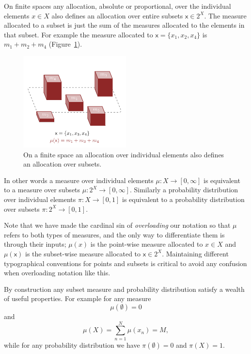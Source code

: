 \documentclass[
  letterpaper,
  DIV=11,
  numbers=noendperiod]{scrartcl}
\begin{document}
On finite spaces any allocation, absolute or proportional, over the
individual elements \(x \in X\) also defines an allocation over entire
subsets \(\mathsf{x} \in 2^{X}\). The measure allocated to a subset is
just the sum of the measures allocated to the elements in that subset.
For example the measure allocated to
\(\mathsf{x} = \{ x_{1}, x_{2}, x_{4} \}\) is \(m_{1} + m_{2} + m_{4}\)
(Figure~\ref{fig-subset_measure}).

\begin{figure}

{\centering \includegraphics[width=0.5\textwidth,height=\textheight]{figures/subset_measure/subset_measure.pdf}

}

\caption{\label{fig-subset_measure}On a finite space an allocation over
individual elements also defines an allocation over subsets.}

\end{figure}

In other words a measure over individual elements
\(\mu : X \rightarrow [0, \infty]\) is equivalent to a measure over
subsets \(\mu : 2^{X} \rightarrow [0, \infty]\). Similarly a probability
distribution over individual elements \(\pi : X \rightarrow [0, 1]\) is
equivalent to a probability distribution over subsets
\(\pi : 2^{X} \rightarrow [0, 1]\).

Note that we have made the cardinal sin of \emph{overloading} our
notation so that \(\mu\) refers to both types of measures, and the only
way to differentiate them is through their inputs; \(\mu(x)\) is the
point-wise measure allocated to \(x \in X\) and \(\mu( \mathsf{x} )\) is
the subset-wise measure allocated to \(\mathsf{x} \in 2^X\). Maintaining
different typographical conventions for points and subsets is critical
to avoid any confusion when overloading notation like this.

By construction any subset measure and probability distribution satisfy
a wealth of useful properties. For example for any measure \[
\mu( \emptyset ) = 0
\] and \[
\mu( X ) = \sum_{n = 1}^{N} \mu(x_{n}) = M,
\] while for any probability distribution we have
\(\pi( \emptyset ) = 0\) and \(\pi( X ) = 1\).
\end{document}
